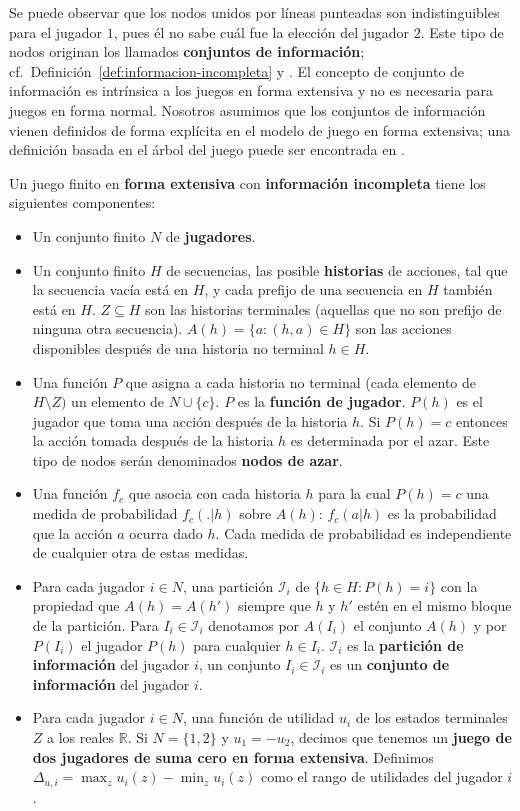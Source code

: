 Se puede observar que los nodos unidos por líneas punteadas son indistinguibles para el jugador $1$, pues él no sabe cuál fue la elección del jugador $2$. Este tipo de nodos originan los llamados \textbf{conjuntos de información}; cf.\ Definición~\ref{def:informacion-incompleta} y \cite[p.~200]{bib:course-game-theory}. El concepto de conjunto de información es intrínsica a los juegos en forma extensiva y no es necesaria para juegos en forma normal. Nosotros asumimos que los conjuntos de información vienen definidos de forma explícita en el modelo de juego en forma extensiva; una definición basada en el árbol del juego puede ser encontrada en \cite{bib:conceptos-basicos}.

\begin{definition}
\label{def:informacion-incompleta}
Un juego finito en \textbf{forma extensiva} con \textbf{información incompleta} tiene los siguientes componentes:
\begin{itemize}[]
  \item Un conjunto finito $N$ de \textbf{jugadores}.
  \item Un conjunto finito $H$ de secuencias, las posible \textbf{historias} de acciones, tal que la secuencia vacía está en $H$, y cada prefijo de una secuencia en $H$ también está en $H$. $Z \subseteq H$ son las historias terminales (aquellas que no son prefijo de ninguna otra secuencia). $A(h) = \{ a : (h, a) \in H \}$ son las acciones disponibles después de una historia no terminal $h \in H$.
  \item Una función $P$ que asigna a cada historia no terminal (cada elemento de $H \setminus Z)$ un elemento de $N \cup \{c \}$. $P$ es la \textbf{función de jugador}. $P(h)$ es el jugador que toma una acción después de la historia $h$. Si $P(h) = c$ entonces la acción tomada después de la historia $h$ es determinada por el azar. Este tipo de nodos serán denominados \textbf{nodos de azar}.
  \item Una función $f_c$ que asocia con cada historia $h$ para la cual $P(h) = c$ una medida de probabilidad $f_c(.|h)$ sobre $A(h)$: $f_c(a|h)$ es la probabilidad que la acción $a$ ocurra dado $h$.  Cada medida de probabilidad es independiente de cualquier otra de estas medidas.
  \item Para cada jugador $i \in N$, una partición $\mathcal{I}_i$ de $\{h \in H : P(h) = i\}$ con la propiedad que $A(h) = A(h')$ siempre que $h$ y $h'$ estén en el mismo bloque de la partición. Para $I_i \in \mathcal{I}_i$ denotamos por $A(I_i)$ el conjunto $A(h)$ y por $P(I_i)$ el jugador $P(h)$ para cualquier $h \in I_i$. $\mathcal{I}_i$ es la \textbf{partición de información} del jugador $i$, un conjunto $I_i \in \mathcal{I}_i$ es un \textbf{conjunto de información} del jugador $i$.
  \item Para cada jugador $i \in N$, una función de utilidad $u_i$ de los estados terminales $Z$ a los reales $\mathbb{R}$. Si $N = \{1,2\}$ y $u_1 = -u_2$, decimos que tenemos un \textbf{juego de dos jugadores de suma cero en forma extensiva}. Definimos $\Delta_{u,i} = \max_z u_i(z) - \min_z u_i(z)$ como el rango de utilidades del jugador $i$.
\end{itemize}
\end{definition}

